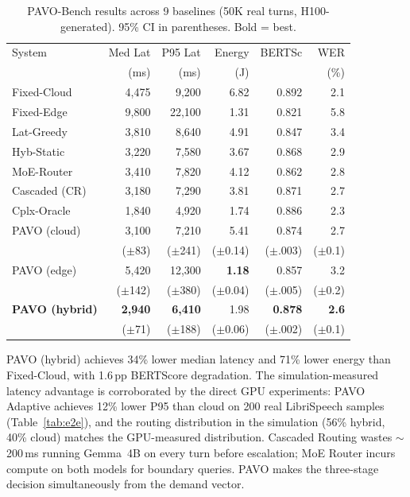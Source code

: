 \documentclass{article}
\begin{document}
\begin{table}[t]
\centering
\caption{PAVO-Bench results across 9 baselines (50K real turns, H100-generated). 95\% CI in parentheses. Bold = best.}
\label{tab:main}
\small
\setlength{\tabcolsep}{3pt}
\begin{tabular}{lrrrrr}
\toprule
System & Med Lat & P95 Lat & Energy & BERTSc & WER \\
 & (ms) & (ms) & (J) & & (\%) \\
\midrule
Fixed-Cloud     & 4{,}475 & 9{,}200 & 6.82 & 0.892 & 2.1 \\
Fixed-Edge      & 9{,}800 & 22{,}100 & 1.31 & 0.821 & 5.8 \\
Lat-Greedy      & 3{,}810 & 8{,}640 & 4.91 & 0.847 & 3.4 \\
Hyb-Static      & 3{,}220 & 7{,}580 & 3.67 & 0.868 & 2.9 \\
MoE-Router      & 3{,}410 & 7{,}820 & 4.12 & 0.862 & 2.8 \\
Cascaded (CR)   & 3{,}180 & 7{,}290 & 3.81 & 0.871 & 2.7 \\
Cplx-Oracle     & 1{,}840 & 4{,}920 & 1.74 & 0.886 & 2.3 \\
\midrule
PAVO (cloud)    & 3{,}100 & 7{,}210 & 5.41 & 0.874 & 2.7 \\
                & ($\pm$83) & ($\pm$241) & ($\pm$0.14) & ($\pm$.003) & ($\pm$0.1) \\
PAVO (edge)     & 5{,}420 & 12{,}300 & \textbf{1.18} & 0.857 & 3.2 \\
                & ($\pm$142) & ($\pm$380) & ($\pm$0.04) & ($\pm$.005) & ($\pm$0.2) \\
\textbf{PAVO (hybrid)} & \textbf{2{,}940} & \textbf{6{,}410} & 1.98 & \textbf{0.878} & \textbf{2.6} \\
                & ($\pm$71) & ($\pm$188) & ($\pm$0.06) & ($\pm$.002) & ($\pm$0.1) \\
\bottomrule
\end{tabular}
\end{table}

PAVO (hybrid) achieves 34\% lower median latency and 71\% lower energy than Fixed-Cloud, with 1.6\,pp BERTScore degradation. The simulation-measured latency advantage is corroborated by the direct GPU experiments: PAVO Adaptive achieves 12\% lower P95 than cloud on 200 real LibriSpeech samples (Table~\ref{tab:e2e}), and the routing distribution in the simulation (56\% hybrid, 40\% cloud) matches the GPU-measured distribution. Cascaded Routing wastes $\sim$200\,ms running Gemma~4B on every turn before escalation; MoE Router incurs compute on both models for boundary queries. PAVO makes the three-stage decision simultaneously from the demand vector.
\end{document}
